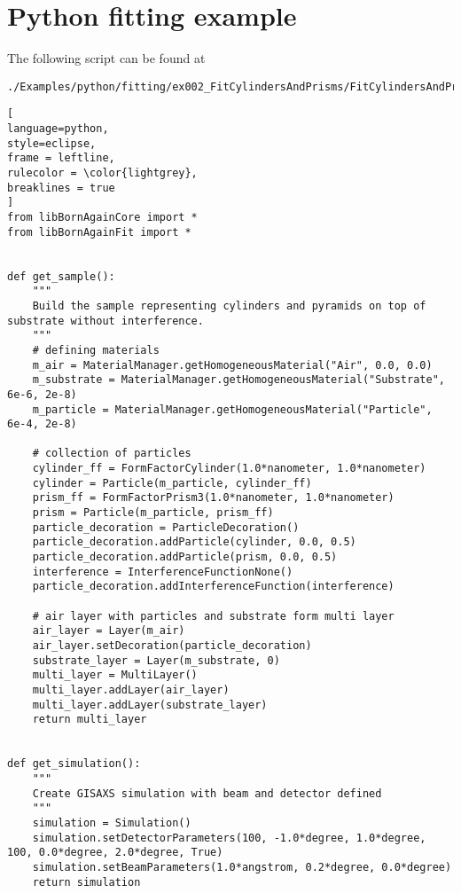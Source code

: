 %
\newpage
\section{Python fitting example} \label{PythonFittingExampleScript}

The following script can be found at
\begin{lstlisting}[language=shell, style=commandline]
./Examples/python/fitting/ex002_FitCylindersAndPrisms/FitCylindersAndPrisms.py
\end{lstlisting}

\begin{lstlisting}[
language=python, 
style=eclipse, 
frame = leftline, 
rulecolor = \color{lightgrey},
breaklines = true
]
from libBornAgainCore import *
from libBornAgainFit import *


def get_sample():
    """
    Build the sample representing cylinders and pyramids on top of substrate without interference.
    """
    # defining materials
    m_air = MaterialManager.getHomogeneousMaterial("Air", 0.0, 0.0)
    m_substrate = MaterialManager.getHomogeneousMaterial("Substrate", 6e-6, 2e-8)
    m_particle = MaterialManager.getHomogeneousMaterial("Particle", 6e-4, 2e-8)

    # collection of particles
    cylinder_ff = FormFactorCylinder(1.0*nanometer, 1.0*nanometer)
    cylinder = Particle(m_particle, cylinder_ff)
    prism_ff = FormFactorPrism3(1.0*nanometer, 1.0*nanometer)
    prism = Particle(m_particle, prism_ff)
    particle_decoration = ParticleDecoration()
    particle_decoration.addParticle(cylinder, 0.0, 0.5)
    particle_decoration.addParticle(prism, 0.0, 0.5)
    interference = InterferenceFunctionNone()
    particle_decoration.addInterferenceFunction(interference)

    # air layer with particles and substrate form multi layer
    air_layer = Layer(m_air)
    air_layer.setDecoration(particle_decoration)
    substrate_layer = Layer(m_substrate, 0)
    multi_layer = MultiLayer()
    multi_layer.addLayer(air_layer)
    multi_layer.addLayer(substrate_layer)
    return multi_layer


def get_simulation():
    """
    Create GISAXS simulation with beam and detector defined
    """
    simulation = Simulation()
    simulation.setDetectorParameters(100, -1.0*degree, 1.0*degree, 100, 0.0*degree, 2.0*degree, True)
    simulation.setBeamParameters(1.0*angstrom, 0.2*degree, 0.0*degree)
    return simulation



\end{lstlisting}
